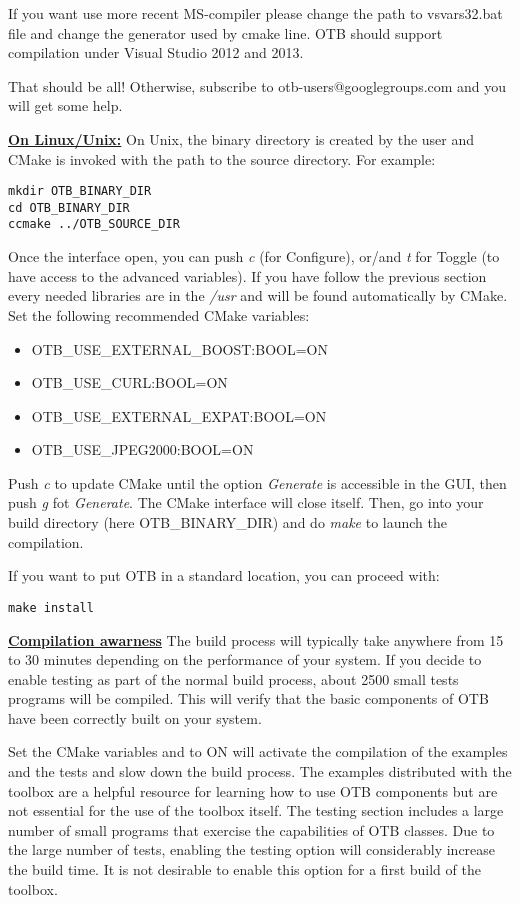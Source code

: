 If you want use more recent MS-compiler please change the path to vsvars32.bat file and change the generator used by cmake line. OTB should support compilation under Visual Studio 2012 and 2013. 

That should be all! Otherwise, subscribe to otb-users@googlegroups.com and you will get some help.

 
\textbf{\underline{On Linux/Unix:}}
On Unix, the binary directory is created by the user and CMake is invoked with the path to the source directory. For example:
\small
\begin{verbatim}
mkdir OTB_BINARY_DIR
cd OTB_BINARY_DIR
ccmake ../OTB_SOURCE_DIR
\end{verbatim}
\normalsize

Once the interface open, you can push \emph{c} (for Configure), or/and \emph{t} for Toggle (to have access to the advanced variables). If you have follow the previous section every needed libraries are in the
\emph{/usr} and will be found automatically by CMake. Set the following recommended CMake variables:
\begin{itemize}
\item OTB\_USE\_EXTERNAL\_BOOST:BOOL=ON
\item OTB\_USE\_CURL:BOOL=ON
\item OTB\_USE\_EXTERNAL\_EXPAT:BOOL=ON
\item OTB\_USE\_JPEG2000:BOOL=ON
\end{itemize}

Push \emph{c} to update CMake until the option \emph{Generate} is accessible in the GUI,
then push \emph{g} fot \emph{Generate}. The CMake interface will close itself.
Then, go into your build directory (here OTB\_BINARY\_DIR) and do \emph{make} to launch the compilation.

If you want to put OTB in a standard location, you can proceed with:

\begin{verbatim}
make install
\end{verbatim}

\textbf{\underline{Compilation awarness}}
The build process will typically take anywhere from 15 to 30 minutes depending on the performance of your system. If you decide to enable testing as part of the normal build process, about 2500 small tests programs will be compiled. This will verify that the basic components of OTB have been correctly built on your system.

Set the CMake variables  and  to ON will activate the compilation of the examples and the tests and slow down the build process. The examples distributed with the toolbox are a helpful resource for learning how to use OTB components but are not essential for the use of the toolbox itself. The testing section includes a large number of small programs that exercise the capabilities of OTB classes. Due to the large number of tests, enabling the testing option will considerably increase the build time.  It is not desirable to enable this option for a first build of the toolbox.


